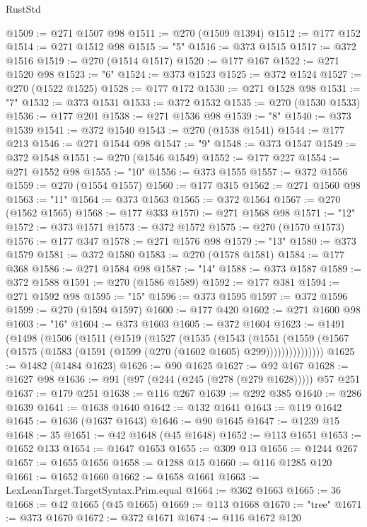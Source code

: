\begin{lexlean}{RustStd}
\begin{coremodule}
@1509 := @271 @1507 @98
@1511 := @270 (@1509 @1394)
@1512 := @177 @152
@1514 := @271 @1512 @98
@1515 := "5"
@1516 := @373 @1515
@1517 := @372 @1516
@1519 := @270 (@1514 @1517)
@1520 := @177 @167
@1522 := @271 @1520 @98
@1523 := "6"
@1524 := @373 @1523
@1525 := @372 @1524
@1527 := @270 (@1522 @1525)
@1528 := @177 @172
@1530 := @271 @1528 @98
@1531 := "7"
@1532 := @373 @1531
@1533 := @372 @1532
@1535 := @270 (@1530 @1533)
@1536 := @177 @201
@1538 := @271 @1536 @98
@1539 := "8"
@1540 := @373 @1539
@1541 := @372 @1540
@1543 := @270 (@1538 @1541)
@1544 := @177 @213
@1546 := @271 @1544 @98
@1547 := "9"
@1548 := @373 @1547
@1549 := @372 @1548
@1551 := @270 (@1546 @1549)
@1552 := @177 @227
@1554 := @271 @1552 @98
@1555 := "10"
@1556 := @373 @1555
@1557 := @372 @1556
@1559 := @270 (@1554 @1557)
@1560 := @177 @315
@1562 := @271 @1560 @98
@1563 := "11"
@1564 := @373 @1563
@1565 := @372 @1564
@1567 := @270 (@1562 @1565)
@1568 := @177 @333
@1570 := @271 @1568 @98
@1571 := "12"
@1572 := @373 @1571
@1573 := @372 @1572
@1575 := @270 (@1570 @1573)
@1576 := @177 @347
@1578 := @271 @1576 @98
@1579 := "13"
@1580 := @373 @1579
@1581 := @372 @1580
@1583 := @270 (@1578 @1581)
@1584 := @177 @368
@1586 := @271 @1584 @98
@1587 := "14"
@1588 := @373 @1587
@1589 := @372 @1588
@1591 := @270 (@1586 @1589)
@1592 := @177 @381
@1594 := @271 @1592 @98
@1595 := "15"
@1596 := @373 @1595
@1597 := @372 @1596
@1599 := @270 (@1594 @1597)
@1600 := @177 @420
@1602 := @271 @1600 @98
@1603 := "16"
@1604 := @373 @1603
@1605 := @372 @1604
@1623 := @1491
    (@1498
      (@1506
        (@1511
          (@1519
            (@1527
              (@1535
                (@1543
                  (@1551
                    (@1559
                      (@1567 (@1575 (@1583 (@1591 (@1599 (@270 (@1602 @1605) @299)))))))))))))))
@1625 := @1482 (@1484 @1623)
@1626 := @90 @1625
@1627 := @92 @167
@1628 := @1627 @98
@1636 := @91 (@97 (@244 (@245 (@278 (@279 @1628))))) @57 @251
@1637 := @179 @251
@1638 := @116 @267
@1639 := @292 @385
@1640 := @286 @1639
@1641 := @1638 @1640
@1642 := @132 @1641
@1643 := @119 @1642
@1645 := @1636 (@1637 @1643)
@1646 := @90 @1645
@1647 := @1239 @15
@1648 := 35
@1651 := @42 @1648 (@45 @1648)
@1652 := @113 @1651
@1653 := @1652 @133
@1654 := @1647 @1653
@1655 := @309 @13
@1656 := @1244 @267
@1657 := @1655 @1656
@1658 := @1288 @15
@1660 := @116 @1285 @120
@1661 := @1652 @1660
@1662 := @1658 @1661
@1663 := LexLeanTarget.TargetSyntax.Prim.equal
@1664 := @362 @1663
@1665 := 36
@1668 := @42 @1665 (@45 @1665)
@1669 := @113 @1668
@1670 := "tree"
@1671 := @373 @1670
@1672 := @372 @1671
@1674 := @116 @1672 @120

\end{coremodule}
\end{lexlean}
